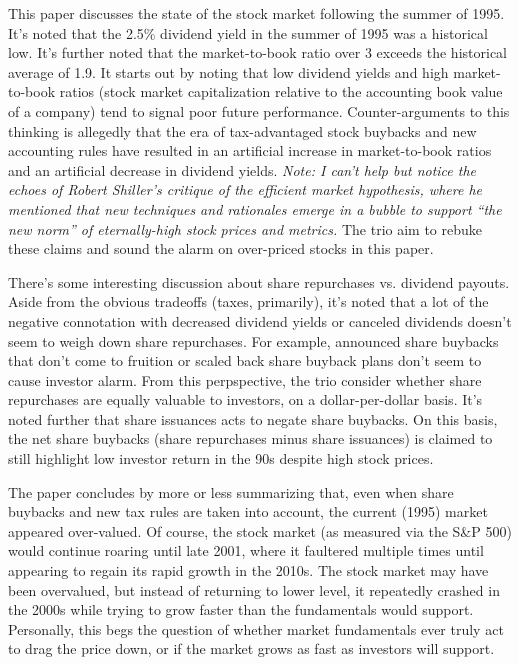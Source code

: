 \documentclass{article}
\begin{document}
This paper discusses the state of the stock market following the summer of 1995.  It's noted that the 2.5\% dividend yield in the summer of 1995 was a historical low.  It's further noted that the market-to-book ratio over 3 exceeds the historical average of 1.9.  It starts out by noting that low dividend yields and high market-to-book ratios (stock market capitalization relative to the accounting book value of a company) tend to signal poor future performance.  Counter-arguments to this thinking is allegedly that the era of tax-advantaged stock buybacks and new accounting rules have resulted in an artificial increase in market-to-book ratios and an artificial decrease in dividend yields.  {\it Note: I can't help but notice the echoes of Robert Shiller's critique of the efficient market hypothesis, where he mentioned that new techniques and rationales emerge in a bubble to support ``the new norm'' of eternally-high stock prices and metrics.}  The trio aim to rebuke these claims and sound the alarm on over-priced stocks in this paper.

There's some interesting discussion about share repurchases vs. dividend payouts.  Aside from the obvious tradeoffs (taxes, primarily), it's noted that a lot of the negative connotation with decreased dividend yields or canceled dividends doesn't seem to weigh down share repurchases.  For example, announced share buybacks that don't come to fruition or scaled back share buyback plans don't seem to cause investor alarm.  From this perpspective, the trio consider whether share repurchases are equally valuable to investors, on a dollar-per-dollar basis.  It's noted further that share issuances acts to negate share buybacks.  On this basis, the net share buybacks (share repurchases minus share issuances) is claimed to still highlight low investor return in the 90s despite high stock prices.

The paper concludes by more or less summarizing that, even when share buybacks and new tax rules are taken into account, the current (1995) market appeared over-valued.  Of course, the stock market (as measured via the S\&P 500) would continue roaring until late 2001, where it faultered multiple times until appearing to regain its rapid growth in the 2010s.  The stock market may have been overvalued, but instead of returning to lower level, it repeatedly crashed in the 2000s while trying to grow faster than the fundamentals would support.  Personally, this begs the question of whether market fundamentals ever truly act to drag the price down, or if the market grows as fast as investors will support.
\end{document}
